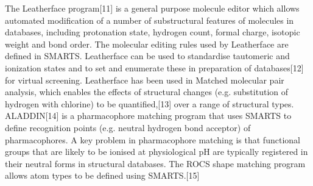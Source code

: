The Leatherface program[11] is a general purpose molecule editor which allows automated modification of a number of substructural features of molecules in databases, including protonation state, hydrogen count, formal charge, isotopic weight and bond order. The molecular editing rules used by Leatherface are defined in SMARTS. Leatherface can be used to standardise tautomeric and ionization states and to set and enumerate these in preparation of databases[12] for virtual screening. Leatherface has been used in Matched molecular pair analysis, which enables the effects of structural changes (e.g. substitution of hydrogen with chlorine) to be quantified,[13] over a range of structural types.
ALADDIN[14] is a pharmacophore matching program that uses SMARTS to define recognition points (e.g. neutral hydrogen bond acceptor) of pharmacophores. A key problem in pharmacophore matching is that functional groups that are likely to be ionised at physiological pH are typically registered in their neutral forms in structural databases. The ROCS shape matching program allows atom types to be defined using SMARTS.[15]

